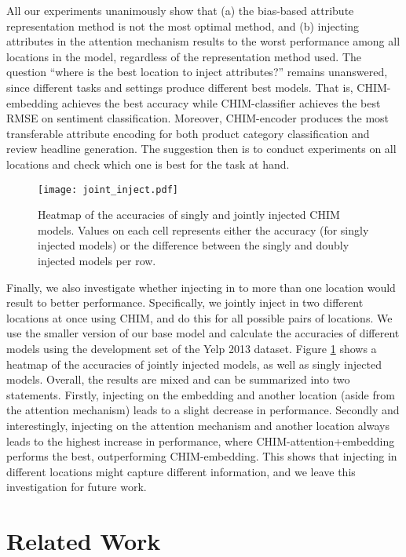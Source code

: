 \documentclass[11pt,a4paper]{article}
\begin{document}
All our experiments unanimously show that (a) the bias-based attribute representation method is not the most optimal method, and (b) injecting attributes in the attention mechanism results to the worst performance among all locations in the model, regardless of the representation method used. The question ``where is the best location to inject attributes?'' remains unanswered, since different tasks and settings produce different best models. That is, CHIM-embedding achieves the best accuracy while CHIM-classifier achieves the best RMSE on sentiment classification. Moreover, CHIM-encoder produces the most transferable attribute encoding for both product category classification and review headline generation. The suggestion then is to conduct experiments on all locations and check which one is best for the task at hand.

\begin{figure}[t]
    \centering
    \texttt{[image: joint\_inject.pdf]}
    \caption{Heatmap of the accuracies of singly and jointly injected CHIM models. Values on each cell represents either the accuracy (for singly injected models) or the difference between the singly and doubly injected models per row.}
    \label{fig:joint_inject}
\end{figure}

Finally, we also investigate whether injecting in to more than one location would result to better performance. Specifically, we jointly inject in two different locations at once using CHIM, and do this for all possible pairs of locations. We use the smaller version of our base model and calculate the accuracies of different models using the development set of the Yelp 2013 dataset.
Figure \ref{fig:joint_inject} shows a heatmap of the accuracies of jointly injected models, as well as singly injected models. Overall, the results are mixed and can be summarized into two statements. Firstly, injecting on the embedding and another location (aside from the attention mechanism) leads to a slight decrease in performance. Secondly and interestingly, injecting on the attention mechanism and another location always leads to the highest increase in performance, where CHIM-attention+embedding performs the best, outperforming CHIM-embedding. This shows that injecting in different locations might capture different information, and we leave this investigation for future work.

\section{Related Work}
\end{document}
